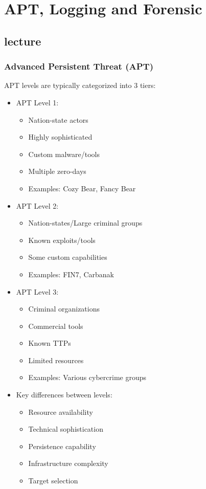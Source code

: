 
\chapter{APT, Logging and Forensic}
\newpage

\section{lecture}

\subsection{Advanced Persistent Threat (APT)}
APT levels are typically categorized into 3 tiers:

\begin{itemize}
  \item APT Level 1:
  \begin{itemize}
    \tightlist
		\item Nation-state actors
		\item Highly sophisticated
		\item Custom malware/tools
		\item Multiple zero-days
		\item Examples: Cozy Bear, Fancy Bear
  \end{itemize}

  \item APT Level 2:
  \begin{itemize}
    \tightlist
		\item Nation-states/Large criminal groups
		\item Known exploits/tools
		\item Some custom capabilities
		\item Examples: FIN7, Carbanak
  \end{itemize}

  \item APT Level 3:
  \begin{itemize}
    \tightlist
		\item Criminal organizations
		\item Commercial tools
		\item Known TTPs
		\item Limited resources
		\item Examples: Various cybercrime groups
  \end{itemize}

  \item Key differences between levels:
  \begin{itemize}
    \tightlist
		\item Resource availability
		\item Technical sophistication
		\item Persistence capability
		\item Infrastructure complexity
		\item Target selection
  \end{itemize}
\end{itemize}

